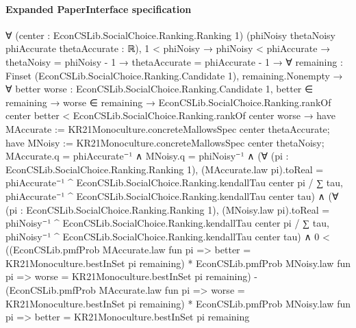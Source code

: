 \documentclass[10pt]{article}
\begin{document}
\paragraph{Expanded PaperInterface specification}
\begin{ReviewVerbatim}
∀ (center : EconCSLib.SocialChoice.Ranking.Ranking 1) (phiNoisy thetaNoisy phiAccurate thetaAccurate : ℝ),
  1 < phiNoisy →
    phiNoisy < phiAccurate →
      thetaNoisy = phiNoisy - 1 →
        thetaAccurate = phiAccurate - 1 →
          ∀ {remaining : Finset (EconCSLib.SocialChoice.Ranking.Candidate 1)},
            remaining.Nonempty →
              ∀ {better worse : EconCSLib.SocialChoice.Ranking.Candidate 1},
                better ∈ remaining →
                  worse ∈ remaining →
                    EconCSLib.SocialChoice.Ranking.rankOf center better <
                        EconCSLib.SocialChoice.Ranking.rankOf center worse →
                      have MAccurate := KR21Monoculture.concreteMallowsSpec center thetaAccurate;
                      have MNoisy := KR21Monoculture.concreteMallowsSpec center thetaNoisy;
                      MAccurate.q = phiAccurate⁻¹ ∧
                        MNoisy.q = phiNoisy⁻¹ ∧
                          (∀ (pi : EconCSLib.SocialChoice.Ranking.Ranking 1),
                              (MAccurate.law pi).toReal =
                                phiAccurate⁻¹ ^ EconCSLib.SocialChoice.Ranking.kendallTau center pi /
                                  ∑ tau, phiAccurate⁻¹ ^ EconCSLib.SocialChoice.Ranking.kendallTau center tau) ∧
                            (∀ (pi : EconCSLib.SocialChoice.Ranking.Ranking 1),
                                (MNoisy.law pi).toReal =
                                  phiNoisy⁻¹ ^ EconCSLib.SocialChoice.Ranking.kendallTau center pi /
                                    ∑ tau, phiNoisy⁻¹ ^ EconCSLib.SocialChoice.Ranking.kendallTau center tau) ∧
                              0 <
                                ((EconCSLib.pmfProb MAccurate.law fun pi =>
                                      better = KR21Monoculture.bestInSet pi remaining) *
                                    EconCSLib.pmfProb MNoisy.law fun pi =>
                                      worse = KR21Monoculture.bestInSet pi remaining) -
                                  (EconCSLib.pmfProb MAccurate.law fun pi =>
                                      worse = KR21Monoculture.bestInSet pi remaining) *
                                    EconCSLib.pmfProb MNoisy.law fun pi =>
                                      better = KR21Monoculture.bestInSet pi remaining
\end{ReviewVerbatim}
\end{document}
